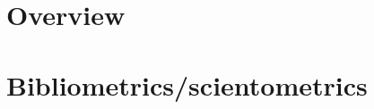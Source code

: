 \documentclass[8pt]{beamer}
\begin{document}
\section*{Overview}

\begin{frame}
\frametitle{\insertsection}
\tableofcontents[hideallsubsections]
\end{frame}








\section{Bibliometrics/scientometrics}


\bgroup
{}
\begin{frame}[plain]{}
\begin{center}
\color{white}{\Huge\insertsection}
\end{center}
\end{frame}
\egroup

\end{document}

